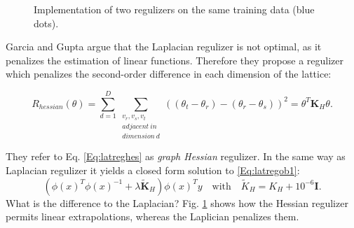 \begin{figure}[htb]%
	\centering
	\hspace{2cm}
	\caption{Implementation of two regulizers on the same training data (blue dots). \citep{garcia2012optimized}}%
	\label{Fig:reg1}%
\end{figure} 

Garcia and Gupta argue that the Laplacian regulizer is not optimal, as it penalizes the estimation of linear functions. Therefore they propose a regulizer which penalizes the second-order difference in each dimension of the lattice:

\begin{equation}
		R_{hessian}(\theta) = \sum_{d=1}^{D}
		\sum_{\substack{v_r, v_s, v_t\\ adjacent\ in\\ dimension\ d}} 
		((\theta_t - \theta_r) - (\theta_r - \theta_s))^2
		= \theta^T\mathbf{K}_H\theta.
		\label{Eq:latreghes}
\end{equation}

They refer to Eq. \ref{Eq:latreghes} as \textit{graph Hessian} regulizer. In the same way as Laplacian regulizer it yields a closed form solution to \ref{Eq:latregob1}: 
\begin{equation*}
	(\phi(x)^T\phi(x)^{-1} + \lambda \mathbf{\tilde{K}}_H)\phi(x)^T y\quad \mathrm{with}\quad \tilde{K}_H = K_H + 10^{-6}\mathbf{I}. 
\end{equation*}
What is the difference to the Laplacian? Fig. \ref{Fig:reg1} shows how the Hessian regulizer permits linear extrapolations, whereas the Laplician penalizes them. 

